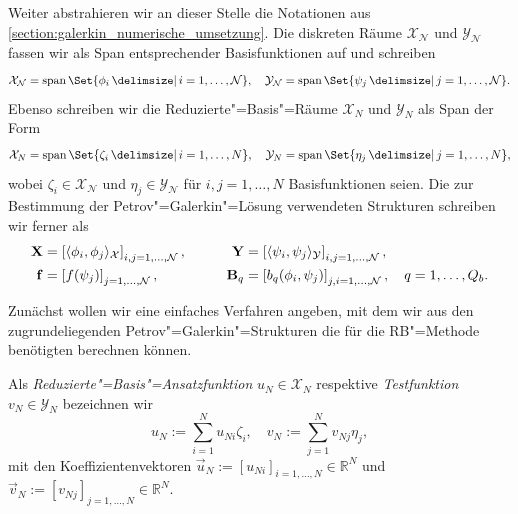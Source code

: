 \documentclass[../main.tex]{subfiles}
\begin{document}
Weiter abstrahieren wir an dieser Stelle die Notationen aus \cref{section:galerkin_numerische_umsetzung}.
Die diskreten Räume $\mathcal X_{\mathcal N}$ und $\mathcal Y_{\mathcal N}$ fassen wir als Span entsprechender Basisfunktionen auf und schreiben
\begin{equation}
    \mathcal X_{\mathcal N} = \spn \Set{ \phi_{i} \given i = 1, \dots, \mathcal N },
    \quad
    \mathcal Y_{\mathcal N} = \spn \Set{ \psi_{j} \given j = 1, \dots, \mathcal N }.
\end{equation}
Ebenso schreiben wir die Reduzierte"=Basis"=Räume $\mathcal X_{N}$ und $\mathcal Y_{N}$ als Span der Form
\begin{equation}
    \mathcal X_{N} = \spn \Set{ \zeta_{i} \given i = 1, \dots, N},
    \quad
    \mathcal Y_{N} = \spn \Set{ \eta_{j} \given j = 1, \dots, N},
\end{equation}
wobei $\zeta_{i} \in \mathcal X_{\mathcal N}$ und $\eta_{j} \in \mathcal Y_{\mathcal N}$ für $i, j = 1, \dots, N$ Basisfunktionen seien.
Die zur Bestimmung der Petrov"=Galerkin"=Lösung verwendeten Strukturen schreiben wir ferner als
\begin{equation}
    \begin{aligned}
        \mathbf{X} &= \left[ \langle\phi_{i},\phi_{j}\rangle_{\mathcal X} \right]_{i,j = 1, \dots, \mathcal N},
        &\qquad
        \mathbf{Y} &= \left[ \langle\psi_{i},\psi_{j}\rangle_{\mathcal Y} \right]_{i,j = 1, \dots, \mathcal N},
        \\
        \mathbf{f} &= \left[ f(\psi_{j}) \right]_{j = 1, \dots, \mathcal N},
        &\qquad
        \mathbf{B}_{q} &= \left[ b_{q}(\phi_{i}, \psi_{j}) \right]_{j,i = 1, \dots, \mathcal N}, \quad q = 1, \dots, Q_{b}.
    \end{aligned}
\end{equation}

Zunächst wollen wir eine einfaches Verfahren angeben, mit dem wir aus den zugrundeliegenden Petrov"=Galerkin"=Strukturen die für die RB"=Methode benötigten berechnen können.

\begin{Definition}
    Als \emph{Reduzierte"=Basis"=Ansatzfunktion} $u_{N} \in \mathcal X_{N}$ respektive \emph{Testfunktion} $v_{N} \in \mathcal Y_{N}$ bezeichnen wir
    \begin{equation}
        u_{N} := \sum_{i = 1}^{N} u_{N i} \zeta_{i},
        \quad
        v_{N} := \sum_{j = 1}^{N} v_{N j} \eta_{j},
    \end{equation}
    mit den Koeffizientenvektoren $\vec{u}_{N} := [u_{Ni}]_{i = 1, \dots, N} \in \mathbb{R}^{N}$ und $\vec{v}_{N} := [v_{Nj}]_{j = 1, \dots, N} \in \mathbb{R}^{N}$.
\end{Definition}
\end{document}
